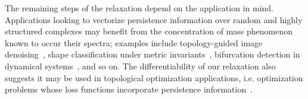 \documentclass[10pt]{article}
\numberwithin{equation}{section}
\newcommand*\boxAppOne[2][Application \#1: Vectorizing persistence information]{%
  \sbox{\mysaveboxM}{#2}%
  \sbox{\mysaveboxT}{\fcolorbox{black}{white}{#1}}%
  \sbox{\mysaveboxM}{%
    \parbox[t][\ht\mysaveboxM+.5\ht\mysaveboxT+.5\dp\mysaveboxT][b]{\wd\mysaveboxM}{#2}%
  }%
  \sbox{\mysaveboxM}{%
    \fcolorbox{black}{shadecolor}{%
      \makebox[\linewidth-1em]{\usebox{\mysaveboxM}}%
    }%
  }%
  \usebox{\mysaveboxM}%
  \makebox[15pt][r]{%
    \makebox[\wd\mysaveboxM][l]{%
      \raisebox{\ht\mysaveboxM-0.5\ht\mysaveboxT+0.5\dp\mysaveboxT-0.5\fboxrule}{\usebox{\mysaveboxT}}%
    }%
  }%
}
\newcommand{\+}{%
	\raisebox{0.18ex}{\scaleobj{0.55}{+}}
}
\theoremstyle{definition}
\theoremstyle{definition}
\begin{document}
\noindent The remaining steps of the relaxation depend on the application in mind. 
Applications looking to vectorize persistence information over random and highly structured complexes may benefit from the concentration of mass phenomenon known to occur their spectra; examples include topology-guided image denoising~\cite{pun2018persistent}, shape classification under metric invariants~\cite{chazal2009gromov}, bifurcation detection in dynamical systems~\cite{perea2022approximating}, and so on. 
The differentiability of our relaxation also suggests it may be used in topological optimization applications, i.e. optimization problems whose loss functions incorporate persistence information~\cite{nigmetov2022topological}. 
\end{document}
